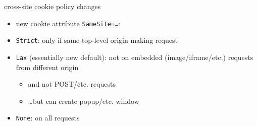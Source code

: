 
\begin{frame}{cross-site cookie policy changes}
    \begin{itemize}
    \item new cookie attribute \texttt{SameSite=\ldots}:
    \item \texttt{Strict}: only if same top-level origin making request
    \item \texttt{Lax} (essentially new default): not on embedded (image/iframe/etc.) requests from different origin
        \begin{itemize}
        \item and not POST/etc. requests
        \item \ldots but can create popup/etc. window
        \end{itemize}
    \item \texttt{None}: on all requests
    \end{itemize}
\end{frame}
